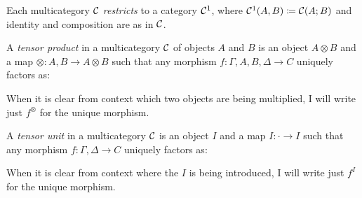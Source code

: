 \begin{definition}
  Each multicategory $\mathcal C$ \emph{restricts} to a category $\mathcal C^1$, where
  $\mathcal C^1(A, B) \coloneqq \mathcal C(A; B)$ and identity and composition are as in $\mathcal C$.
\end{definition}

\begin{definition}\label{def:tensor-product}
  A \emph{tensor product} in a multicategory $\mathcal C$ of objects $A$ and $B$ is an
  object $A \otimes B$ and a map ${\otimes} : A, B \to A \otimes B$ such that
  any morphism $f : \Gamma, A, B, \Delta \to C$ uniquely factors as:


  When it is clear from context which two objects are being multiplied, I will
  write just $f^{\otimes}$ for the unique morphism.
\end{definition}

\begin{definition}\label{def:tensor-unit}
  A \emph{tensor unit} in a multicategory $\mathcal C$ is an object $I$ and a map
  $I : {\cdot} \to I$ such that any morphism
  $f : \Gamma, \Delta \to C$ uniquely factors as:


  When it is clear from context where the $I$ is being introduced, I will
  write just $f^I$ for the unique morphism.
\end{definition}

